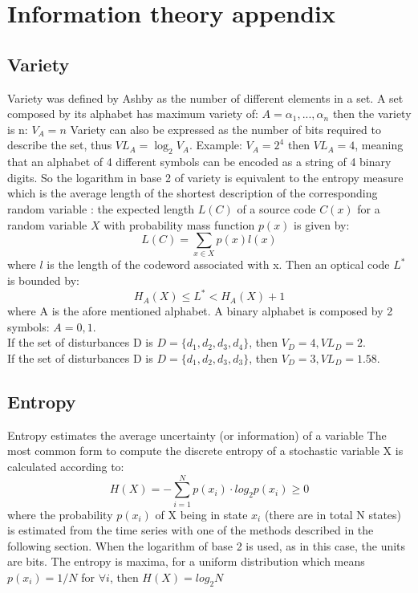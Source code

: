 
\section{Information theory appendix}
\subsection{Variety}
Variety was defined by Ashby as the number of different elements in a set.
A set composed by its alphabet has maximum variety of: $A={\alpha_1,...,\alpha_n}$
then the variety is n: $V_A=n$
Variety can also be expressed as the number of bits required to describe the set,
thus $VL_A=\log_2 V_A$.
Example: $V_A=2^{4}$ then $VL_A=4$, meaning that an alphabet of 4 different
symbols can be encoded as a string of 4 binary digits. So the logarithm in
base 2 of variety is equivalent to the entropy measure which is the average
length of the shortest description of the corresponding random variable
\citep{Shannon76}: the expected length $L(C)$ of a source code $C(x)$ for
a random variable $X$ with probability mass function $p(x)$ is given by:
\begin{equation}
 L(C)=\sum_{x\in X}p(x)l(x)
\end{equation}
where $l$ is the length of the codeword associated with x.
Then an optical code $L^*$ is bounded by:
\begin{equation}
 H_A(X)\leq L^* < H_A(X)+1
\end{equation}
where A is the afore mentioned alphabet. A binary alphabet is
composed by 2 symbols: $A={0,1}$.\\
If the set of disturbances D is $D=\{ d_1,d_2,d_3,d_4 \}$, then $V_D=4,VL_D=2$.\\
If the set of disturbances D is $D=\{ d_1,d_2,d_3,d_3 \}$, then $V_D=3,VL_D=1.58$.\\

\subsection{Entropy}
Entropy estimates the average uncertainty (or information) of a variable \citep{Shannon76}
The most common form to compute the discrete entropy of a stochastic variable X is calculated according to:
\begin{equation}
 H(X)=-\sum_{i=1}^{N} p(x_{i})\cdot log_2 p(x_i) \geq 0
\end{equation}
where the probability $p(x_i)$ of X being in state $x_i$ (there are in total N states)
is estimated from the time series with one of the methods described in the following section.
When the logarithm of base 2 is used, as in this case, the units are bits.
The entropy is maxima, for a uniform distribution which means
$p(x_{i})=1/N$ for $\forall i$, then $H(X)=log_2 N$

